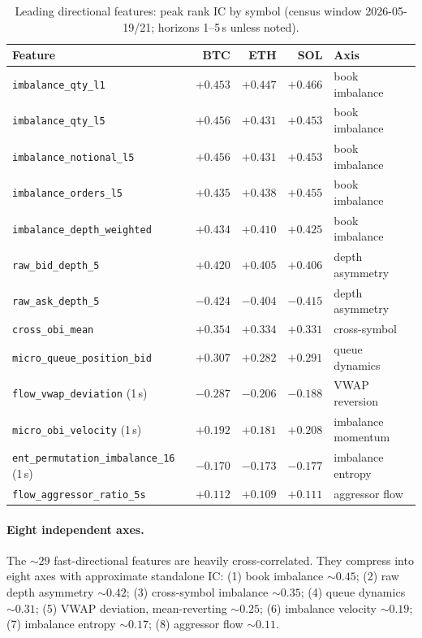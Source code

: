 \documentclass[11pt,a4paper]{article}
\theoremstyle{definition}
\theoremstyle{plain}
\newcommand{\toprule}{\hline\hline}
\newcommand{\midrule}{\hline}
\newcommand{\bottomrule}{\hline\hline}
\newcommand{\feat}[1]{\texttt{#1}}
\begin{document}
\begin{table}[htbp]
\centering
\small
\caption{Leading directional features: peak rank IC by symbol
(census window 2026-05-19/21; horizons 1--5\,s unless noted).}
\label{tab:directional}
\begin{tabular}{lrrrl}
\toprule
Feature & BTC & ETH & SOL & Axis \\
\midrule
\feat{imbalance\_qty\_l1}        & $+0.453$ & $+0.447$ & $+0.466$ & book imbalance \\
\feat{imbalance\_qty\_l5}        & $+0.456$ & $+0.431$ & $+0.453$ & book imbalance \\
\feat{imbalance\_notional\_l5}   & $+0.456$ & $+0.431$ & $+0.453$ & book imbalance \\
\feat{imbalance\_orders\_l5}     & $+0.435$ & $+0.438$ & $+0.455$ & book imbalance \\
\feat{imbalance\_depth\_weighted}& $+0.434$ & $+0.410$ & $+0.425$ & book imbalance \\
\feat{raw\_bid\_depth\_5}        & $+0.420$ & $+0.405$ & $+0.406$ & depth asymmetry \\
\feat{raw\_ask\_depth\_5}        & $-0.424$ & $-0.404$ & $-0.415$ & depth asymmetry \\
\feat{cross\_obi\_mean}          & $+0.354$ & $+0.334$ & $+0.331$ & cross-symbol \\
\feat{micro\_queue\_position\_bid}& $+0.307$ & $+0.282$ & $+0.291$ & queue dynamics \\
\feat{flow\_vwap\_deviation} (1\,s) & $-0.287$ & $-0.206$ & $-0.188$ & VWAP reversion \\
\feat{micro\_obi\_velocity} (1\,s)  & $+0.192$ & $+0.181$ & $+0.208$ & imbalance momentum \\
\feat{ent\_permutation\_imbalance\_16} (1\,s) & $-0.170$ & $-0.173$ & $-0.177$ & imbalance entropy \\
\feat{flow\_aggressor\_ratio\_5s}   & $+0.112$ & $+0.109$ & $+0.111$ & aggressor flow \\
\bottomrule
\end{tabular}
\end{table}

\paragraph{Eight independent axes.} The ${\sim}29$ fast-directional
features are heavily cross-correlated. They compress into eight
axes with approximate standalone IC:
(1) book imbalance ${\sim}0.45$;
(2) raw depth asymmetry ${\sim}0.42$;
(3) cross-symbol imbalance ${\sim}0.35$;
(4) queue dynamics ${\sim}0.31$;
(5) VWAP deviation, mean-reverting ${\sim}0.25$;
(6) imbalance velocity ${\sim}0.19$;
(7) imbalance entropy ${\sim}0.17$;
(8) aggressor flow ${\sim}0.11$.
\end{document}
